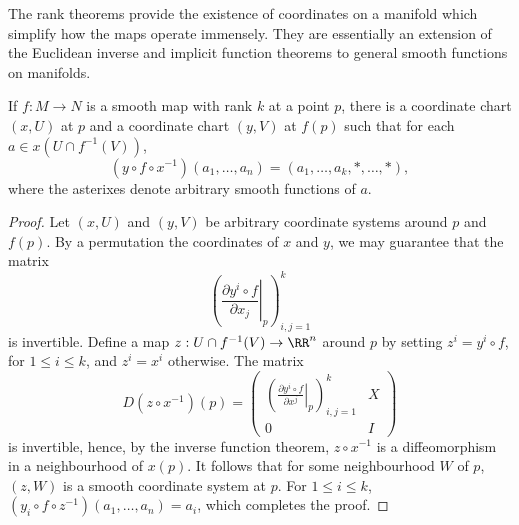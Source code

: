 The rank theorems provide the existence of coordinates on a manifold which simplify how the maps operate immensely. They are essentially an extension of the Euclidean inverse and implicit function theorems to general smooth functions on manifolds.

\begin{theorem}
    If $f: M \to N$ is a smooth map with rank $k$ at a point $p$, there is a coordinate chart $(x,U)$ at $p$ and a coordinate chart $(y,V)$ at $f(p)$ such that for each $a \in x(U \cap f^{-1}(V))$,
    \[ (y \circ f \circ x^{-1})(a_1,\dots,a_n) = (a_1,\dots,a_k,*,\dots,*), \]
    where the asterixes denote arbitrary smooth functions of $a$.
\end{theorem}
\begin{proof}
    Let $(x,U)$ and $(y,V)$ be arbitrary coordinate systems around $p$ and $f(p)$. By a permutation the coordinates of $x$ and $y$, we may guarantee that the matrix
    \[ \left( \left.\frac{\partial y^i \circ f}{\partial x_j}\right|_p \right)_{i,j = 1}^k \]
    is invertible. Define a map $z:U \cap f^{-1}(V) \to \RR^n$ around $p$ by setting $z^i = y^i \circ f$, for $1 \leq i \leq k$, and $z^i = x^i$ otherwise. The matrix
    \[ D(z \circ x^{-1})(p) = \begin{pmatrix} \left( \left.\frac{\partial y^i \circ f}{\partial x^j}\right|_p \right)_{i,j = 1}^k & X \\ 0 & I \end{pmatrix} \]
    is invertible, hence, by the inverse function theorem, $z \circ x^{-1}$ is a diffeomorphism in a neighbourhood of $x(p)$. It follows that for some neighbourhood $W$ of $p$, $(z,W)$ is a smooth coordinate system at $p$. For $1 \leq i \leq k$, $(y_i \circ f \circ z^{-1})(a_1,\dots, a_n) = a_i$, which completes the proof.
\end{proof}

